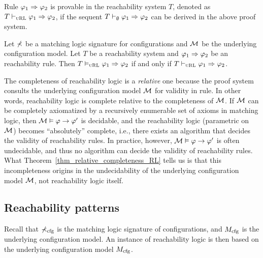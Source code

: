 \documentclass{amsart}
\begin{document}
Rule $\varphi_1 \Rightarrow \varphi_2$ is provable in the reachability system $T$,
denoted as $T \vdash_{\textsc{uRL}} \varphi_1 \Rightarrow \varphi_2$,
if the sequent $T \vdash_\emptyset \varphi_1 \Rightarrow \varphi_2$ can be derived
in the above proof system.
\begin{theorem}
	\label{thm_relative_completeness_RL}
	Let $\mathbb{\Sigma}$ be a matching logic signature for configurations
	and $\mathcal{M}$ be the underlying configuration model.
	Let $T$ be a reachability system and 
	$\varphi_1 \Rightarrow \varphi_2$ be an  reachability rule.
	Then $T \vDash_{\textsc{uRL}} \varphi_1 \Rightarrow \varphi_2$
	if and only if $T \vdash_{\textsc{uRL}} \varphi_1 \Rightarrow \varphi_2$.
\end{theorem}
The completeness of  reachability logic
is a \emph{relative} one 
because the proof system consults the underlying configuration model $\mathcal{M}$
for validity in  rule.
In other words,  reachability logic is complete
relative to the completeness of $\mathcal{M}$.
If $\mathcal{M}$ can be completely axiomatized by a recursively enumerable
set of axioms in matching logic,
then $\mathcal{M} \vDash \varphi \to \varphi'$ is decidable,
and the  reachability logic 
(parametric on $\mathcal{M}$) becomes ``absolutely'' complete, i.e.,
there exists an algorithm that decides the validity of 
reachability rules.
In practice, however, $\mathcal{M} \vDash \varphi \to \varphi'$ is often undecidable,
and thus no algorithm can decide the validity of reachability rules.
What Theorem~\ref{thm_relative_completeness_RL} tells us is that
this incompleteness origins in the undecidability of the underlying
configuration model $\mathcal{M}$, not reachability logic itself.

\subsection{Reachability patterns}

Recall that $\mathbb{\Sigma}_{\mathrm{cfg}}$ is the matching logic signature of configurations,
and $M_{\mathrm{cfg}}$ is the underlying configuration model.
An instance of reachability logic is then based 
on the underlying configuration model $M_{\mathrm{cfg}}$.
\end{document}
